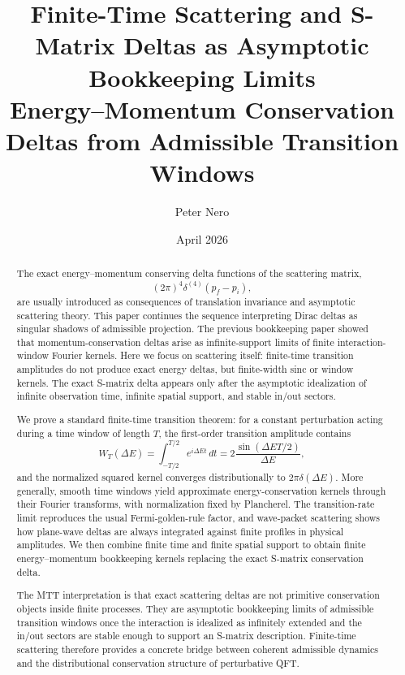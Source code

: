 \documentclass[11pt]{article}
\title{Finite-Time Scattering and S-Matrix Deltas as Asymptotic Bookkeeping Limits\\
\large Energy--Momentum Conservation Deltas from Admissible Transition Windows}
\author{Peter Nero}
\date{April 2026}
\begin{document}
\maketitle

\begin{abstract}
The exact energy--momentum conserving delta functions of the scattering matrix,
\[
(2\pi)^4\delta^{(4)}(p_f-p_i),
\]
are usually introduced as consequences of translation invariance and asymptotic scattering theory.  This paper continues the sequence interpreting Dirac deltas as singular shadows of admissible projection.  The previous bookkeeping paper showed that momentum-conservation deltas arise as infinite-support limits of finite interaction-window Fourier kernels.  Here we focus on scattering itself: finite-time transition amplitudes do not produce exact energy deltas, but finite-width sinc or window kernels.  The exact S-matrix delta appears only after the asymptotic idealization of infinite observation time, infinite spatial support, and stable in/out sectors.

We prove a standard finite-time transition theorem: for a constant perturbation acting during a time window of length \(T\), the first-order transition amplitude contains
\[
W_T(\Delta E)=\int_{-T/2}^{T/2}e^{i\Delta E t}\,dt
=2\frac{\sin(\Delta E T/2)}{\Delta E},
\]
and the normalized squared kernel converges distributionally to \(2\pi\delta(\Delta E)\).  More generally, smooth time windows yield approximate energy-conservation kernels through their Fourier transforms, with normalization fixed by Plancherel.  The transition-rate limit reproduces the usual Fermi-golden-rule factor, and wave-packet scattering shows how plane-wave deltas are always integrated against finite profiles in physical amplitudes.  We then combine finite time and finite spatial support to obtain finite energy--momentum bookkeeping kernels replacing the exact S-matrix conservation delta.

The MTT interpretation is that exact scattering deltas are not primitive conservation objects inside finite processes.  They are asymptotic bookkeeping limits of admissible transition windows once the interaction is idealized as infinitely extended and the in/out sectors are stable enough to support an S-matrix description.  Finite-time scattering therefore provides a concrete bridge between coherent admissible dynamics and the distributional conservation structure of perturbative QFT.
\end{abstract}

\tableofcontents
\end{document}

